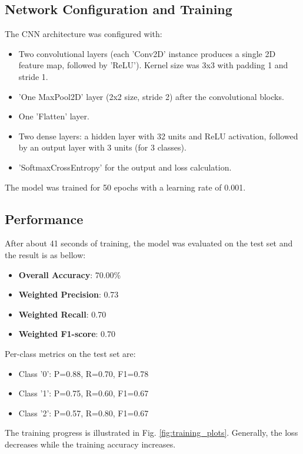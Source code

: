 \documentclass[conference]{IEEEtran}
\begin{document}
\subsection{Network Configuration and Training}
The CNN architecture was configured with:
\begin{itemize}
    \item Two convolutional layers (each 'Conv2D' instance produces a single 2D feature map, followed by 'ReLU'). Kernel size was 3x3 with padding 1 and stride 1.
    \item 'One MaxPool2D' layer (2x2 size, stride 2) after the convolutional blocks.
    \item One 'Flatten' layer.
    \item Two dense layers: a hidden layer with 32 units and ReLU activation, followed by an output layer with 3 units (for 3 classes).
    \item 'SoftmaxCrossEntropy' for the output and loss calculation.
\end{itemize}
The model was trained for 50 epochs with a learning rate of 0.001.

\subsection{Performance}
After about 41 seconds of training, the model was evaluated on the test set and the result is as bellow:

\begin{itemize}
    \item \textbf{Overall Accuracy}: 70.00\%
    \item \textbf{Weighted Precision}: 0.73
    \item \textbf{Weighted Recall}: 0.70
    \item \textbf{Weighted F1-score}: 0.70
\end{itemize}

Per-class metrics on the test set are:
\begin{itemize}
    \item Class '0': P=0.88, R=0.70, F1=0.78
    \item Class '1': P=0.75, R=0.60, F1=0.67
    \item Class '2': P=0.57, R=0.80, F1=0.67
\end{itemize}

The training progress is illustrated in Fig. \ref{fig:training_plots}. Generally, the loss decreases while the training accuracy increases.
\end{document}
